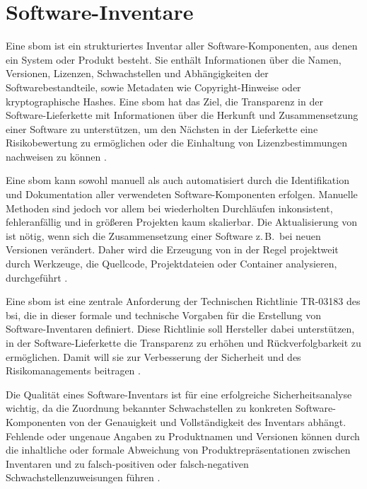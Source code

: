 \section{Software-Inventare}\label{sec:def-inventories}

Eine \acrfull{sbom} ist ein strukturiertes Inventar aller Software-Komponenten, aus denen ein System oder Produkt besteht.
Sie enthält Informationen über die Namen, Versionen, Lizenzen, Schwachstellen und Abhängigkeiten der Softwarebestandteile, sowie Metadaten wie Copyright-Hinweise oder kryptographische Hashes.
Eine \acrshort{sbom} hat das Ziel, die Transparenz in der Software-Lieferkette mit Informationen über die Herkunft und Zusammensetzung einer Software zu unterstützen, um den Nächsten in der Lieferkette eine Risikobewertung zu ermöglichen oder die Einhaltung von Lizenzbestimmungen nachweisen zu können \autocite{Bi_Xia_Xing_Lu_Zhu_2023}.

Eine \acrshort{sbom} kann sowohl manuell als auch automatisiert durch die Identifikation und Dokumentation aller verwendeten Software-Komponenten erfolgen.
Manuelle Methoden sind jedoch vor allem bei wiederholten Durchläufen inkonsistent, fehleranfällig und in größeren Projekten kaum skalierbar.
Die Aktualisierung von  ist nötig, wenn sich die Zusammensetzung einer Software z.\,B.\ bei neuen Versionen verändert.
Daher wird die Erzeugung von  in der Regel projektweit durch Werkzeuge, die Quellcode, Projektdateien oder Container analysieren, durchgeführt \autocite{Bi_Xia_Xing_Lu_Zhu_2023}.

Eine \acrshort{sbom} ist eine zentrale Anforderung der Technischen Richtlinie TR-03183 des \acrfull{bsi}, die in dieser formale und technische Vorgaben für die Erstellung von Software-Inventaren definiert.
Diese Richtlinie soll Hersteller dabei unterstützen, in der Software-Lieferkette die Transparenz zu erhöhen und Rückverfolgbarkeit zu ermöglichen.
Damit will sie zur Verbesserung der Sicherheit und des Risikomanagements beitragen \autocite{BSI_TR03183}.

Die Qualität eines Software-Inventars ist für eine erfolgreiche Sicherheitsanalyse wichtig, da die Zuordnung bekannter Schwachstellen zu konkreten Software-Komponenten von der Genauigkeit und Vollständigkeit des Inventars abhängt.
Fehlende oder ungenaue Angaben zu Produktnamen und Versionen können durch die inhaltliche oder formale Abweichung von Produktrepräsentationen zwischen Inventaren und  zu falsch-positiven oder falsch-negativen Schwachstellenzuweisungen führen \autocite{Idrissi_Sebai_Faroukhi_Mahouachi_2024}.

